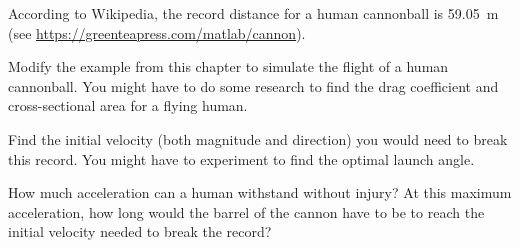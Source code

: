 \begin{ex}
\label{cannon}


According to Wikipedia, the record distance for a human cannonball is \SI {59.05}{\meter} (see \url{https://greenteapress.com/matlab/cannon}).

Modify the example from this chapter to simulate the flight of a human cannonball.  You might have to do some research to find the drag coefficient and cross-sectional area for a flying human.

Find the initial velocity (both magnitude and direction) you would need to break this record.  You might have to experiment to find the optimal launch angle.

How much acceleration can a human withstand without injury?  At this maximum acceleration, how long would the barrel of the cannon have to be to reach the initial velocity needed to break the record?

\end{ex}
